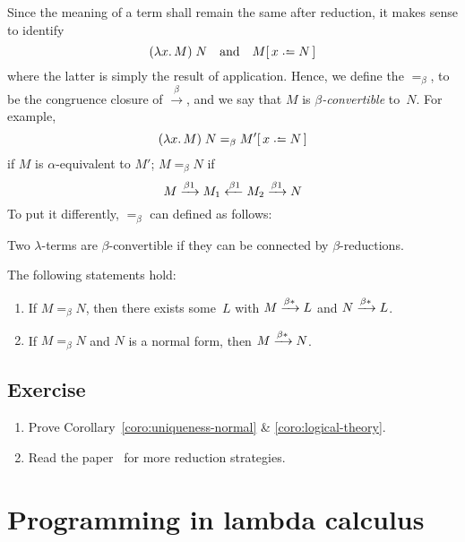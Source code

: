 Since the meaning of a term shall remain the same after reduction, it makes
sense to identify 
\[
  (\lambda x.\, M)\;N
  \quad\text{and}\quad
  M\subst{x}{N}
\]
where the latter is simply the result of application. Hence, we define the
$=_\beta$, to be the congruence closure of $\xrightarrow{\beta}$, and we say
that $M$ is \emph{$\beta$-convertible} to~$N$. For example, 
\[
  (\lambda x.\, M)\;N
  =_\beta
  M'\subst{x}{N}
\]
if $M$ is $\alpha$-equivalent to $M'$;
$M =_\beta N$ if
\[
  M \onereduce M_1 \xleftarrow{\beta1} M_2 \onereduce N
\]
To put it differently, $=_\beta$ can defined as follows:
\begin{multicols}{3}
\begin{prooftree}
\end{prooftree}
\begin{prooftree}
\end{prooftree}
\begin{prooftree}
\end{prooftree}
\end{multicols}
Two $\lambda$-terms are $\beta$-convertible if they can be connected by
$\beta$-reductions.
\begin{corollary} \label{coro:logical-theory}
  The following statements hold:
  \begin{enumerate}
    \item If $M =_\beta N$, then there exists some~$L$ with $M \reduce L$ and $N
      \reduce L$.
    \item If $M =_\beta N$ and $N$ is a normal form, then 
      $M \reduce N$.
  \end{enumerate}
\end{corollary}
\subsection*{Exercise}
\begin{enumerate}
  \item Prove
    Corollary~\ref{coro:uniqueness-normal} \& \ref{coro:logical-theory}.
  \item Read the paper~\cite[Section 7]{Sestoft2002} for more reduction
    strategies.
\end{enumerate}
\section{Programming in lambda calculus}
